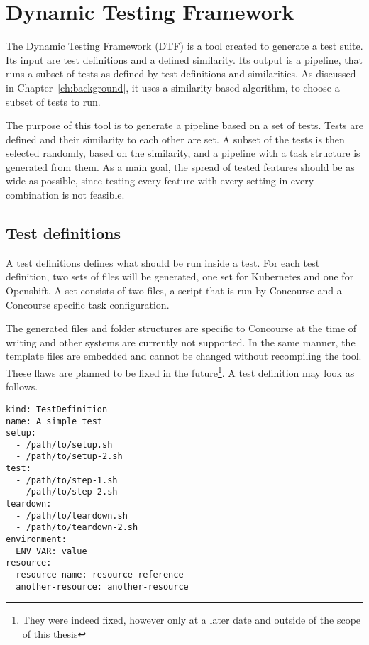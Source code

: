 \section{Dynamic Testing Framework}\label{sec:dynamic-testing-framework}

The Dynamic Testing Framework (DTF) is a tool created to generate a test suite.
Its input are test definitions and a defined similarity.
Its output is a pipeline, that runs a subset of tests as defined by test definitions and similarities.
As discussed in Chapter~\ref{ch:background}, it uses a similarity based algorithm, to choose a subset of tests to run.

The purpose of this tool is to generate a pipeline based on a set of tests.
Tests are defined and their similarity to each other are set.
A subset of the tests is then selected randomly, based on the similarity, and a pipeline with a task structure is generated from them.
As a main goal, the spread of tested features should be as wide as possible, since testing every feature with every setting in every combination is not feasible.

\subsection{Test definitions}\label{subsec:test-definitions}

A test definitions defines what should be run inside a test.
For each test definition, two sets of files will be generated, one set for Kubernetes and one for Openshift.
A set consists of two files, a script that is run by Concourse and a Concourse specific task configuration.

\pagebreak

The generated files and folder structures are specific to Concourse at the time of writing and other systems are currently not supported.
In the same manner, the template files are embedded and cannot be changed without recompiling the tool.
These flaws are planned to be fixed in the future\footnote{They were indeed fixed, however only at a later date and outside of the scope of this thesis}.
A test definition may look as follows.

\begin{verbatim}
kind: TestDefinition
name: A simple test
setup:
  - /path/to/setup.sh
  - /path/to/setup-2.sh
test:
  - /path/to/step-1.sh
  - /path/to/step-2.sh
teardown:
  - /path/to/teardown.sh
  - /path/to/teardown-2.sh
environment:
  ENV_VAR: value
resource:
  resource-name: resource-reference
  another-resource: another-resource
\end{verbatim}

